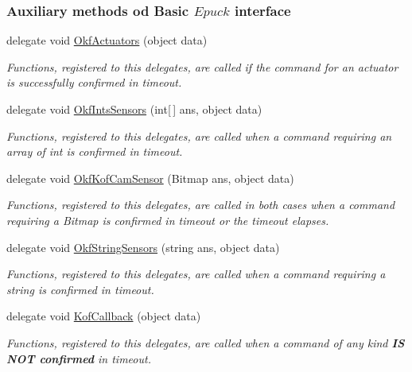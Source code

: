 \subsubsection*{Auxiliary methods od Basic $Epuck$ interface} %
\label{ssub:Auxiliary methods od Basic $Epuck$ interface}
  \begin{DoxyCompactItemize}

  \item delegate void \hyperlink{class_elib_1_1_epuck_a410eea190419792987ceb49c2a7b2c9b}{OkfActuators} (object data)
  \begin{DoxyCompactList}\small\item\em Functions, registered to this delegates, are called if the command for an actuator is successfully confirmed in timeout.   \end{DoxyCompactList}

  \item   delegate void \hyperlink{class_elib_1_1_epuck_ae28892dce5a837c025be2d29e80ccab7}{OkfIntsSensors} (int\mbox{[}$\,$\mbox{]} ans, object data)
  \begin{DoxyCompactList}\small\item\em Functions, registered to this delegates, are called when a command requiring an array of {\ttfamily int} is confirmed in timeout. \item\end{DoxyCompactList}

  \item  delegate void \hyperlink{class_elib_1_1_epuck_a0b10e3ac7ceeaee8f73bc5194366e3d4}{OkfKofCamSensor} (Bitmap ans, object data)
  \begin{DoxyCompactList}\small\item\em Functions, registered to this delegates, are called in both cases when a command requiring a {\ttfamily Bitmap} is confirmed in timeout or the timeout elapses. \item\end{DoxyCompactList}
  
  \item   delegate void \hyperlink{class_elib_1_1_epuck_a4bfdd999c7ba6f9e1282077b2cec1cc0}{OkfStringSensors} (string ans, object data)
  \begin{DoxyCompactList}\small\item\em Functions, registered to this delegates, are called when a command requiring a {\ttfamily string} is confirmed in timeout. \item\end{DoxyCompactList}
  
  \item   delegate void \hyperlink{class_elib_1_1_epuck_a4bfdd999c7ba6f9e1282077b2cec1cc1}{KofCallback} (object data)
  \begin{DoxyCompactList}\small\item\em Functions, registered to this delegates,  are called when a command of any kind \textbf{IS NOT confirmed} in timeout. \item\end{DoxyCompactList}

  \end{DoxyCompactItemize}

